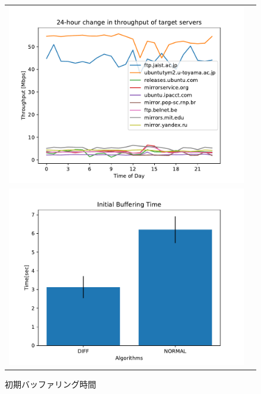 \documentclass[a4j,12pt]{gradthesis_utf8}
\begin{document}
\begin{figure}[ht]
    \begin{center}
        \begin{tabular}{cc}
        	\begin{minipage}[t]{0.9\hsize}
        		\includegraphics[width=14cm]{figure/thp24h.pdf}
        		\caption{各パブリックミラーの24時間の性能の変化}
        		\label{24h}
        	\end{minipage}\\
        	\begin{minipage}[t]{0.9\hsize}
        		\includegraphics[width=14cm]{figure/InitialBufferingTimePub.pdf}
        		\caption{初期バッファリング時間}
        		\label{ibtpub}
        	\end{minipage}\\

        \end{tabular}
    \end{center}
\end{figure}
\end{document}
